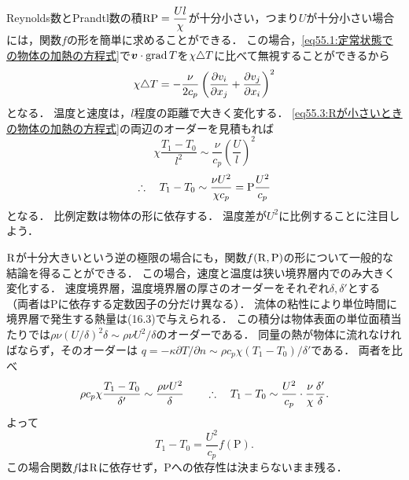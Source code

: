 Reynolds数とPrandtl数の積$\mathrm{R}\mathrm{P}=\dfrac{Ul}{\chi}$が十分小さい，つまり$U$が十分小さい場合には，関数$f$の形を簡単に求めることができる．
この場合，\eqref{eq55.1:定常状態での物体の加熱の方程式}で$\vb*{v}\cdot\operatorname{grad} T$を$\chi \triangle T$に比べて無視することができるから
\begin{equation}\label{eq55.3:Rが小さいときの物体の加熱の方程式}
    \chi \triangle T = - \frac{\nu}{2c_p} \left( \pdv{v_i}{x_j} + \pdv{v_j}{x_i} \right)^2
\end{equation}
となる．
温度と速度は，$l$程度の距離で大きく変化する．
\eqref{eq55.3:Rが小さいときの物体の加熱の方程式}の両辺のオーダーを見積もれば
\[
    \chi \frac{T_1-T_0}{l^2} \sim \frac{\nu}{c_p} \left( \frac{U}{l} \right)^2
\]
\begin{equation}
    \therefore\quad T_1 - T_0 \sim \frac{\nu U^2}{\chi c_p} = \mathrm{P} \frac{U^2}{c_p}
\end{equation}
となる．
比例定数は物体の形に依存する．
温度差が$U^2$に比例することに注目しよう．


$\mathrm{R}$が十分大きいという逆の極限の場合にも，関数$f(\mathrm{R},\mathrm{P})$の形について一般的な結論を得ることができる．
この場合，速度と温度は狭い境界層内でのみ大きく変化する．
速度境界層，温度境界層の厚さのオーダーをそれぞれ$\delta,\delta'$とする
（両者は$\mathrm{P}$に依存する定数因子の分だけ異なる）．
流体の粘性により単位時間に境界層で発生する熱量は(16.3)で与えられる．
この積分は物体表面の単位面積当たりでは$\rho\nu (U/\delta)^2 \delta \sim \rho\nu U^2/\delta$のオーダーである．
同量の熱が物体に流れなければならず，そのオーダーは
$q = -\kappa \partial T/\partial n \sim \rho c_p\chi (T_1-T_0)/\delta'$である．
両者を比べ
\[
    \rho c_p\chi \frac{T_1-T_0}{\delta'} \sim \frac{\rho\nu U^2}{\delta}
    \qquad \therefore\quad T_1-T_0 \sim \frac{U^2}{c_p} \cdot\frac{\nu}{\chi} \frac{\delta'}{\delta}.
\]
よって
\begin{equation}
    T_1-T_0 = \frac{U^2}{c_p} f(\mathrm{P}).
\end{equation}
この場合関数$f$は$\mathrm{R}$に依存せず，$\mathrm{P}$への依存性は決まらないまま残る．






